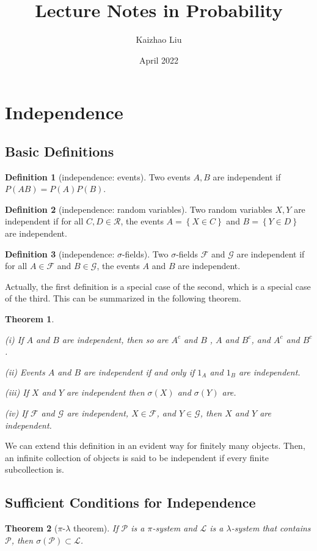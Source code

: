 \documentclass{article}
\title{Lecture Notes in Probability}
\author{Kaizhao Liu}
\date{April 2022}
\newtheorem{Thm}{Theorem}[section]
\theoremstyle{definition}
\newtheorem{Def}{Definition}[section]
\begin{document}
\maketitle
\tableofcontents
\section{Independence}
\subsection{Basic Definitions}
\begin{Def}[independence: events]
Two events $A,B$ are independent if $P(AB)=P(A)P(B)$.
\end{Def}
\begin{Def}[independence: random variables]
Two random variables $X,Y$ are independent if for all $C,D\in \mathcal{R}$, the events $A=\left \{ X\in C \right \} $ and $B=\left \{ Y\in D \right \} $ are independent.
\end{Def}
\begin{Def}[independence: $\sigma$-fields]
Two $\sigma$-fields $\mathcal{F}$ and $\mathcal{G}$ are independent if for all $A\in\mathcal{F}$ and $B\in\mathcal{G}$, the events $A$ and $B$ are independent.
\end{Def}
Actually, the first definition is a special case of the second, which is a special case of the third. This can be summarized in the following theorem.
\begin{Thm}
\,\par
(i) If $A$ and $B$ are independent, then so are $A^c$ and $B$ , $A$ and $B^c$, and $A^c$ and $B^c$.\par
(ii) Events $A$ and $B$ are independent if and only if $1_A$ and $1_B$ are independent.\par
(iii) If $X$ and $Y$ are independent then $\sigma(X)$ and $\sigma(Y)$ are.\par
(iv) If $\mathcal{F}$ and $\mathcal{G}$ are independent, $X\in\mathcal{F}$, and $Y\in\mathcal{G}$, then $X$ and $Y$ are independent.
\end{Thm}
We can extend this definition in an evident way for finitely many objects. Then, an infinite collection of objects is said to be independent if every finite subcollection is.
\subsection{Sufficient Conditions for Independence}
\begin{Thm}[$\pi$-$\lambda$ theorem]
If $\mathcal{P}$ is a $\pi$-system and $\mathcal{L}$ is a $\lambda$-system that contains $\mathcal{P}$, then $\sigma(\mathcal{P})\subset \mathcal{L}$.
\end{Thm}
\end{document}

